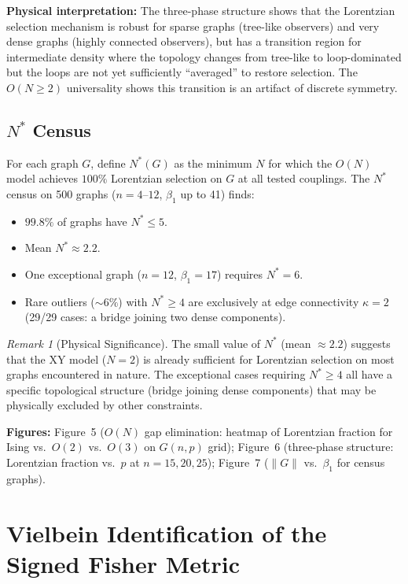 \documentclass[11pt]{article}
\theoremstyle{definition}
\theoremstyle{remark}
\newtheorem{remark}[theorem]{Remark}
\newcommand{\betti}{\beta_1}
\newcommand{\Ein}{G}
\begin{document}
\textbf{Physical interpretation:} The three-phase structure shows
that the Lorentzian selection mechanism is robust for sparse graphs
(tree-like observers) and very dense graphs (highly connected observers),
but has a transition region for intermediate density where the topology
changes from tree-like to loop-dominated but the loops are not yet
sufficiently ``averaged'' to restore selection. The $O(N \geq 2)$
universality shows this transition is an artifact of discrete symmetry.

\subsection{$N^*$ Census}
\label{subsec:nstar-census}

For each graph $G$, define $N^*(G)$ as the minimum $N$ for which
the $O(N)$ model achieves $100\%$ Lorentzian selection on $G$ at
all tested couplings. The $N^*$ census on 500 graphs ($n = 4$--$12$,
$\betti$ up to 41) finds:
\begin{itemize}
\item $99.8\%$ of graphs have $N^* \leq 5$.
\item Mean $N^* \approx 2.2$.
\item One exceptional graph ($n = 12$, $\betti = 17$) requires $N^* = 6$.
\item Rare outliers ($\sim 6\%$) with $N^* \geq 4$ are exclusively
  at edge connectivity $\kappa = 2$ (29/29 cases: a bridge joining
  two dense components).
\end{itemize}

\begin{remark}[Physical Significance]
The small value of $N^*$ (mean $\approx 2.2$) suggests that the
XY model ($N = 2$) is already sufficient for Lorentzian selection on
most graphs encountered in nature. The exceptional cases requiring
$N^* \geq 4$ all have a specific topological structure (bridge joining
dense components) that may be physically excluded by other constraints.
\end{remark}

\textbf{Figures:} Figure~5 ($O(N)$ gap elimination: heatmap of Lorentzian
fraction for Ising vs.\ $O(2)$ vs.\ $O(3)$ on $G(n,p)$ grid);
Figure~6 (three-phase structure: Lorentzian fraction vs.\ $p$ at
$n = 15, 20, 25$); Figure~7 ($\|\Ein\|$ vs.\ $\betti$ for census graphs).


\section{Vielbein Identification of the Signed Fisher Metric}
\label{sec:vielbein}
\end{document}
